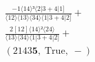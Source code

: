 \documentclass[varwidth, border=5pt]{standalone}
\begin{document}
\begin{my}
$\begin{gathered}
\scriptscriptstyle\frac{-1⟨14⟩³⟨2|3+4|1]}{⟨12⟩⟨13⟩⟨34⟩⟨1|3+4|2]} +\\
\scriptscriptstyle\frac{2[12]⟨14⟩²⟨24⟩}{⟨13⟩⟨34⟩⟨1|3+4|2]} +\\
\scriptscriptstyle(2143𝟓,\;\text{True},\;-) \phantom{+}
\end{gathered}$
\end{my}
\end{document}

